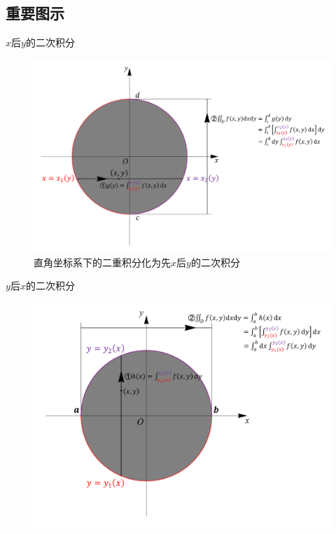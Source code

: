 \documentclass[12pt,UTF8]{ctexart}
\begin{document}
\subsection{重要图示}
\begin{enumerate}
$x$后$y$的二次积分
\begin{figure}[H]
\begin{center}
\includegraphics[height=0.5\textheight,angle=0]{Figures20190611/planex2y.pdf}
\end{center}
\caption{直角坐标系下的二重积分化为先$x$后$y$的二次积分}
\end{figure}
$y$后$x$的二次积分
\begin{figure}[H]
\begin{center}
\includegraphics[height=0.5\textheight,angle=0]{Figures20190611/planey2x.pdf}

\end{center}
\end{figure}
\end{enumerate}
\end{document}
